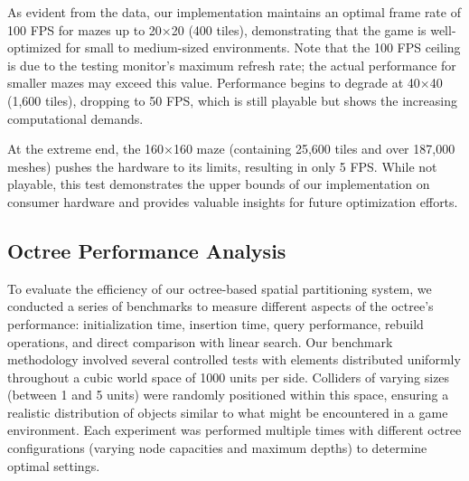 \documentclass{article}
\begin{document}
As evident from the data, our implementation maintains an optimal frame rate of 100 FPS for mazes up to 20×20 (400 tiles), demonstrating that the game is well-optimized for small to medium-sized environments. Note that the 100 FPS ceiling is due to the testing monitor's maximum refresh rate; the actual performance for smaller mazes may exceed this value. Performance begins to degrade at 40×40 (1,600 tiles), dropping to 50 FPS, which is still playable but shows the increasing computational demands.

At the extreme end, the 160×160 maze (containing 25,600 tiles and over 187,000 meshes) pushes the hardware to its limits, resulting in only 5 FPS. While not playable, this test demonstrates the upper bounds of our implementation on consumer hardware and provides valuable insights for future optimization efforts.

\subsection{Octree Performance Analysis}
To evaluate the efficiency of our octree-based spatial partitioning system, we conducted a series of benchmarks to measure different aspects of the octree's performance: initialization time, insertion time, query performance, rebuild operations, and direct comparison with linear search. Our benchmark methodology involved several controlled tests with elements distributed uniformly throughout a cubic world space of 1000 units per side. Colliders of varying sizes (between 1 and 5 units) were randomly positioned within this space, ensuring a realistic distribution of objects similar to what might be encountered in a game environment. Each experiment was performed multiple times with different octree configurations (varying node capacities and maximum depths) to determine optimal settings.
\end{document}

